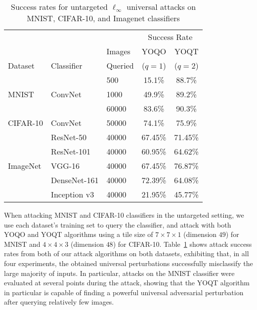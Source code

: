 \documentclass[letterpaper]{article}
\begin{document}
	\begin{table}[t]
		\centering
		\begin{tabular}{lllcc}
			\toprule
			&  &  & \multicolumn{2}{c}{Success Rate}   \\
			&  & Images & YOQO   & YOQT  \\ 
			Dataset & Classifier & Queried & ($q=1$)   & ($q=2$)  \\ 
			\midrule
			& & 500   & 15.1\% & 88.7\% \\
			MNIST & ConvNet & 1000  & 49.9\% & 89.2\% \\
			& & 60000 & 83.6\% & 90.3\% \\
			\midrule
			CIFAR-10 & ConvNet     & 50000 & 74.1\% & 75.9\% \\
			\midrule
			& \small ResNet-50    & 40000 & 67.45\% & 71.45\%  \\
			& \small ResNet-101   & 40000 & 60.95\% & 64.62\%  \\
			ImageNet & \small VGG-16       & 40000 & 67.45\% & 76.87\%  \\
			& \small DenseNet-161 & 40000 & 72.39\% & 64.08\%  \\
			& \small Inception v3 & 40000 & 21.95\% & 45.77\%  \\
			\bottomrule
		\end{tabular}
		\caption{Success rates for untargeted $\ell_\infty$ universal attacks on MNIST, CIFAR-10, and Imagenet classifiers}
		\label{tab:untargeted}
	\end{table}
	
	When attacking MNIST and CIFAR-10 classifiers in the untargeted setting, we use each dataset's training set to query the classifier, and attack with both YOQO and YOQT algorithms using a tile size of $7 \times 7 \times 1$ (dimension $49$) for MNIST and $4 \times 4 \times 3$ (dimension $48$) for CIFAR-10. Table~\ref{tab:untargeted} shows attack success rates from both of our attack algorithms on both datasets, exhibiting that, in all four experiments, the obtained universal perturbations successfully misclassify the large majority of inputs. In particular, attacks on the MNIST classifier were evaluated at several points during the attack, showing that the YOQT algorithm in particular is capable of finding a powerful universal adversarial perturbation after querying relatively few images.
	
\end{document}
